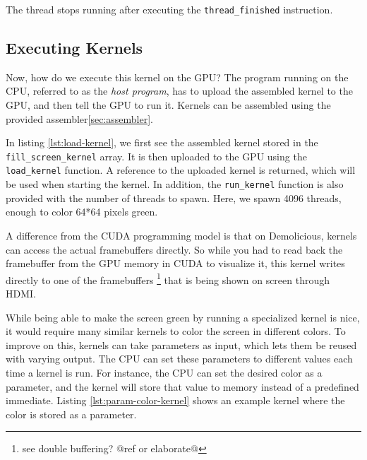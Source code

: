 \documentclass[../main/report.tex]{subfiles}
\begin{document}
The thread stops running after executing the \verb/thread_finished/ instruction.

\subsection{Executing Kernels}

Now, how do we execute this kernel on the GPU?
The program running on the CPU, referred to as the \emph{host program},
has to upload the assembled kernel to the GPU, and then tell the GPU to run it.
Kernels can be assembled using the provided assembler\ref{sec:assembler}.


In listing \ref{lst:load-kernel}, we first see the assembled kernel stored in the
\verb/fill_screen_kernel/ array.
It is then uploaded to the GPU using the \verb/load_kernel/ function.
A reference to the uploaded kernel is returned, which will be used when starting the kernel.
In addition, the \verb/run_kernel/ function is also provided with the number of threads to spawn.
Here, we spawn 4096 threads, enough to color 64*64 pixels green.

A difference from the CUDA programming model is that on Demolicious, kernels can access the actual framebuffers directly.
So while you had to read back the framebuffer from the GPU memory in CUDA to visualize it,
this kernel writes directly to one of the framebuffers \footnote{see double buffering? @ref or elaborate@} that is being shown on screen through HDMI.

While being able to make the screen green by running a specialized kernel is nice,
it would require many similar kernels to color the screen in different colors.
To improve on this, kernels can take parameters as input,
which lets them be reused with varying output.
The CPU can set these parameters to different values each time a kernel is run.
For instance, the CPU can set the desired color as a parameter,
and the kernel will store that value to memory instead of a predefined immediate.
Listing \ref{lst:param-color-kernel} shows an example kernel where the color is stored as a parameter.
\end{document}
